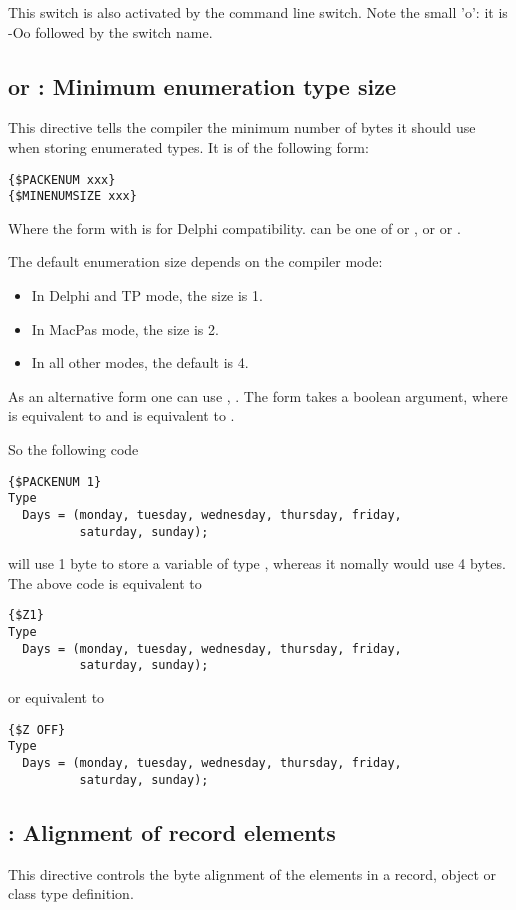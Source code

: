 This switch is also activated by the  command line switch.
Note the small 'o': it is -Oo followed by the switch name.

\subsection{ or  : Minimum enumeration type size}
\label{se:Packenum}

This directive tells the compiler the minimum number of bytes it should
use when storing enumerated types. It is of the following form:
\begin{verbatim}
{$PACKENUM xxx}
{$MINENUMSIZE xxx}
\end{verbatim}
Where the form with  is for Delphi compatibility.
 can be one of  or , or  or
.

The default enumeration size depends on the compiler mode:
\begin{itemize}
\item In Delphi and TP mode, the size is 1.
\item In MacPas mode, the size is 2.
\item In all other modes, the default is 4.
\end{itemize}

As an alternative form one can use , 
. The  form takes a boolean argument, 
where  is equivalent to  and  is 
equivalent to .

So the following code
\begin{verbatim}
{$PACKENUM 1}
Type
  Days = (monday, tuesday, wednesday, thursday, friday,
          saturday, sunday);
\end{verbatim}
will use 1 byte to store a variable of type , whereas it nomally
would use 4 bytes. The above code is equivalent to
\begin{verbatim}
{$Z1}
Type
  Days = (monday, tuesday, wednesday, thursday, friday,
          saturday, sunday);
\end{verbatim}
or equivalent to
\begin{verbatim}
{$Z OFF}
Type
  Days = (monday, tuesday, wednesday, thursday, friday,
          saturday, sunday);
\end{verbatim}

\subsection{ : Alignment of record elements}
\label{se:Packrecords}
This directive controls the byte alignment of the elements in a record,
object or class type definition.

